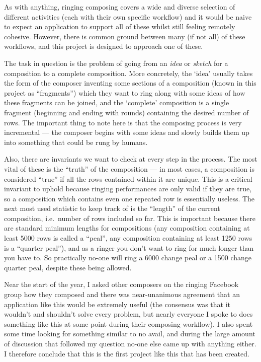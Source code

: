 \documentclass[12pt]{article}
\begin{document}
As with anything, ringing composing covers a wide and diverse selection of different activities
(each with their own specific workflow) and it would be naive to expect an application to support
all of these whilst still feeling remotely cohesive.  However, there is common ground between many
(if not all) of these workflows, and this project is designed to approach one of these.

The task in question is the problem of going from an \emph{idea} or \emph{sketch} for a composition
to a complete composition.  More concretely, the `idea' usually takes the form of the composer
inventing some sections of a composition (known in this project as ``fragments'') which they want to
ring along with some ideas of how these fragments can be joined, and the `complete' composition is a
single fragment (beginning and ending with rounds) containing the desired number of rows.  The
important thing to note here is that the composing process is very incremental --- the composer
begins with some ideas and slowly builds them up into something that could be rung by humans.

Also, there are invariants we want to check at every step in the process.  The most vital of these
is the ``truth'' of the composition --- in most cases, a composition is considered ``true'' if all
the rows contained within it are unique.  This is a critical invariant to uphold because ringing
performances are only valid if they are true, so a composition which contains even one repeated row
is essentially useless.  The next most used statistic to keep track of is the ``length'' of the
current composition, i.e.\ number of rows included so far.  This is important because there are
standard minimum lengths for compositions (any composition containing at least 5000 rows is called a
``peal'', any composition containing at least 1250 rows is a ``quarter peal''), and as a ringer you
don't want to ring for much longer than you have to.  So practically no-one will ring a 6000 change
peal or a 1500 change quarter peal, despite these being allowed.

Near the start of the year, I asked other composers on the ringing Facebook group how they composed
and there was near-unanimous agreement that an application like this would be extremely useful (the
consensus was that it wouldn't and shouldn't solve every problem, but nearly everyone I spoke to
does something like this at some point during their composing workflow).  I also spent some time
looking for something similar to no avail, and during the large amount of discussion that followed
my question no-one else came up with anything either.  I therefore conclude that this is the first
project like this that has been created.
\end{document}
